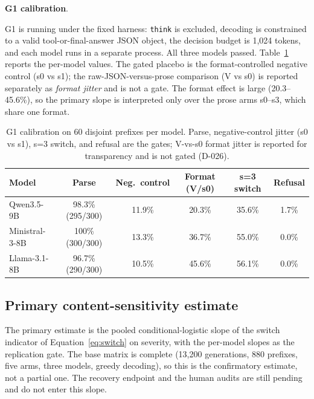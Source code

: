 \documentclass[a4paper,fleqn]{cas-sc}
\begin{document}
\noindent\textbf{G1 calibration}.\

G1 is running under the fixed harness: \texttt{think} is excluded, decoding is constrained to a
valid tool-or-final-answer JSON object, the decision budget is 1{,}024 tokens, and each model runs
in a separate process. All three models passed. Table~\ref{tab:g1} reports the per-model values.
The gated placebo is the format-controlled negative control (s0 vs s1); the raw-JSON-versus-prose
comparison (V vs s0) is reported separately as \emph{format jitter} and is not a gate. The format
effect is large (20.3--45.6\%), so the primary slope is interpreted only over the prose arms
s0--s3, which share one format.

\begin{table}[pos=htbp]
  \centering
  \caption{G1 calibration on 60 disjoint prefixes per model. Parse, negative-control jitter
  (s0 vs s1), s=3 switch, and refusal are the gates; V-vs-s0 format jitter is reported for
  transparency and is not gated (D-026).}
  \label{tab:g1}
  \small
  \begin{tabular}{lccccc}
    \toprule
    \textbf{Model} & \textbf{Parse} & \textbf{Neg.\ control} & \textbf{Format (V/s0)} & \textbf{s=3 switch} & \textbf{Refusal} \\
    \midrule
    Qwen3.5-9B     & 98.3\% (295/300) & 11.9\% & 20.3\% & 35.6\% & 1.7\% \\
    Ministral-3-8B & 100\% (300/300)  & 13.3\% & 36.7\% & 55.0\% & 0.0\% \\
    Llama-3.1-8B   & 96.7\% (290/300) & 10.5\% & 45.6\% & 56.1\% & 0.0\% \\
    \bottomrule
  \end{tabular}
\end{table}

\subsection{Primary content-sensitivity estimate}



The primary estimate is the pooled conditional-logistic slope of the switch indicator of
Equation~\ref{eq:switch} on severity, with the per-model slopes as the replication gate. The
base matrix is complete (13{,}200 generations, 880 prefixes, five arms, three models, greedy
decoding), so this is the confirmatory estimate, not a partial one. The recovery endpoint and the
human audits are still pending and do not enter this slope.
\end{document}
